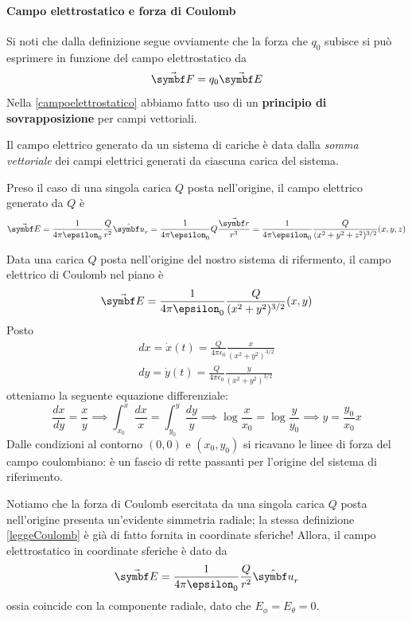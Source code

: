 \paragraph{Campo elettrostatico e forza di Coulomb}
Si noti che dalla definizione segue ovviamente che la forza che $q_0$ subisce si può esprimere in funzione del campo elettrostatico da
\begin{equation}
	\vba{F}=q_0\vba{E}
\end{equation}
Nella \ref{campoelettrostatico} abbiamo fatto uso di un \textbf{principio di sovrapposizione} per campi vettoriali.
\begin{principle}
	Il campo elettrico generato da un sistema di cariche è data dalla \textit{somma vettoriale} dei campi elettrici generati da ciascuna carica del sistema.
\end{principle}
Preso il caso di una singola carica $Q$ posta nell'origine, il campo elettrico generato da $Q$ è
\begin{equation*}
	\vba{E}=\frac{1}{4\pi\epsilon_0}\frac{Q}{r^2}\vbh{u}_{r}=\frac{1}{4\pi\epsilon_0}Q\frac{\vba{r}}{r^3}=\frac{1}{4\pi\epsilon_0}\frac{Q}{(x^2+y^2+z^2)^{3/2}}(x,y,z)
\end{equation*}
\begin{examplewt}
	Data una carica $Q$ posta nell'origine del nostro sistema di rifermento, il campo elettrico di Coulomb nel piano è
	\begin{equation*}
		\vba{E}=\frac{1}{4\pi\epsilon_0}\frac{Q}{(x^2+y^2)^{3/2}}(x,y)
	\end{equation*}
Posto
\begin{gather*}
	dx=\dot{x}(t)=\frac{Q}{4\pi\epsilon_0}\frac{x}{(x^2+y^2)^{3/2}}\\
	dy=\dot{y}(t)=\frac{Q}{4\pi\epsilon_0}\frac{y}{(x^2+y^2)^{3/2}}
\end{gather*}
otteniamo la seguente equazione differenziale:
\begin{equation*}
	\frac{dx}{dy}=\frac{x}{y}\implies\int_{x_0}^{x}\frac{dx}{x}=\int_{y_0}^{y}\frac{dy}{y}
	\implies \log\frac{x}{x_0}=\log\frac{y}{y_0}\implies y=\frac{y_0}{x_0}x
\end{equation*}
Dalle condizioni al contorno $(0,0)$ e $(x_0,y_0)$ si ricavano le linee di forza del campo coulombiano: è un fascio di rette passanti per l'origine del sistema di riferimento.
\end{examplewt}
\begin{observe}
	Notiamo che la forza di Coulomb esercitata da una singola carica $Q$ posta nell'origine presenta un'evidente simmetria radiale; la stessa definizione \ref{leggeCoulomb} è già di fatto fornita in coordinate sferiche! Allora, il campo elettrostatico in coordinate sferiche è dato da
	\begin{equation*}
		\vba{E}=\frac{1}{4\pi\epsilon_0}\frac{Q}{r^2}\vbh{u}_{r}
	\end{equation*}
	ossia coincide con la componente radiale, dato che $E_\phi=E_\theta=0$.
\end{observe}
